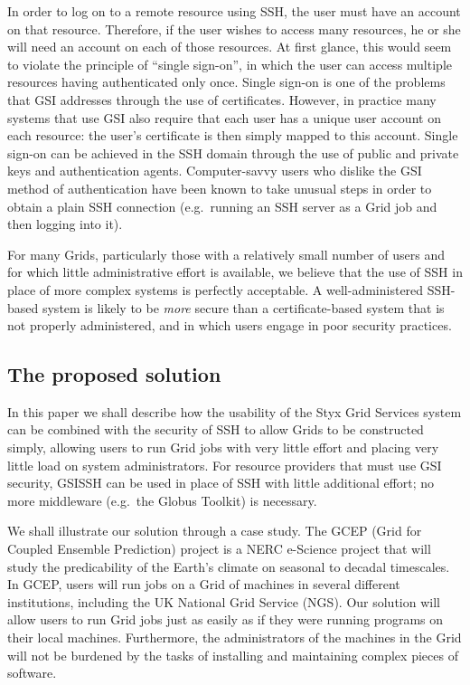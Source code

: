 \documentclass[a4paper]{article}
\begin{document}
\begin{multicols}{2}
In order to log on to a remote resource using SSH, the user must have an account on that resource.  Therefore, if the user wishes to access many resources, he or she will need an account on each of those resources.  At first glance, this would seem to violate the principle of ``single sign-on'', in which the user can access multiple resources having authenticated only once.  Single sign-on is one of the problems that GSI addresses through the use of certificates.  However, in practice many systems that use GSI also require that each user has a unique user account on each resource: the user's certificate is then simply mapped to this account.  Single sign-on can be achieved in the SSH domain through the use of public and private keys and authentication agents.  Computer-savvy users who dislike the GSI method of authentication have been known to take unusual steps in order to obtain a plain SSH connection (e.g.\ running an SSH server as a Grid job and then logging into it).

For many Grids, particularly those with a relatively small number of users and for which little administrative effort is available, we believe that the use of SSH in place of more complex systems is perfectly acceptable.  A well-administered SSH-based system is likely to be {\em more\/} secure than a certificate-based system that is not properly administered, and in which users engage in poor security practices.

\subsection{The proposed solution}
In this paper we shall describe how the usability of the Styx Grid Services system can be combined with the security of SSH to allow Grids to be constructed simply, allowing users to run Grid jobs with very little effort and placing very little load on system administrators.  For resource providers that must use GSI security, GSISSH can be used in place of SSH with little additional effort; no more middleware (e.g.\ the Globus Toolkit) is necessary.

We shall illustrate our solution through a case study.  The GCEP (Grid for Coupled Ensemble Prediction) project is a NERC e-Science project that will study the predicability of the Earth's climate on seasonal to decadal timescales.  In GCEP, users will run jobs on a Grid of machines in several different institutions, including the UK National Grid Service (NGS).  Our solution will allow users to run Grid jobs just as easily as if they were running programs on their local machines.  Furthermore, the administrators of the machines in the Grid will not be burdened by the tasks of installing and maintaining complex pieces of software.



\end{multicols}
\end{document}
